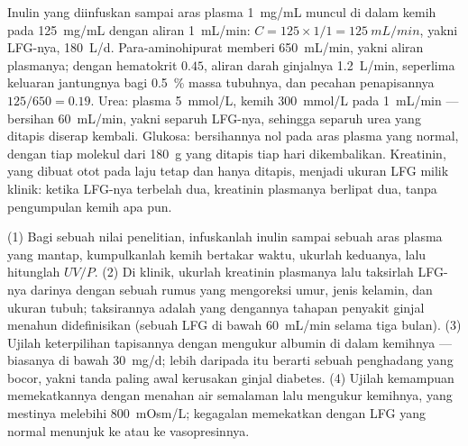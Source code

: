 \begin{example}\label{ex:b3:renal-osmoregulation:numbers}
Inulin yang diinfuskan sampai aras plasma \qty{1}{mg/mL} muncul di dalam kemih pada
\qty{125}{mg/mL} dengan aliran \qty{1}{mL/min}: $C = 125\times 1/1 =
\qty{125}{mL/min}$, yakni LFG-nya, \qty{180}{L/d}. Para-aminohipurat
memberi \qty{650}{mL/min}, yakni aliran plasmanya; dengan hematokrit $0.45$,
aliran darah ginjalnya \qty{1.2}{L/min}, seperlima keluaran
jantungnya bagi \qty{0.5}{\%} massa tubuhnya, dan pecahan penapisannya
$125/650 = 0.19$. Urea: plasma \qty{5}{mmol/L}, kemih \qty{300}{mmol/L}
pada \qty{1}{mL/min} --- bersihan \qty{60}{mL/min}, yakni separuh LFG-nya, sehingga separuh
urea yang ditapis diserap kembali. Glukosa: bersihannya nol pada aras
plasma yang normal, dengan tiap molekul dari \qty{180}{g} yang ditapis tiap hari
dikembalikan. Kreatinin, yang dibuat otot pada laju tetap dan hanya
ditapis, menjadi ukuran LFG milik klinik: ketika LFG-nya terbelah dua,
kreatinin plasmanya berlipat dua, tanpa pengumpulan kemih apa pun.
\end{example}

\begin{method}\label{met:b3:renal-osmoregulation:gfr}
(1) Bagi sebuah nilai penelitian, infuskanlah inulin sampai sebuah aras plasma yang mantap,
kumpulkanlah kemih bertakar waktu, ukurlah keduanya, lalu hitunglah $UV/P$. (2) Di
klinik, ukurlah kreatinin plasmanya lalu taksirlah LFG-nya darinya
dengan sebuah rumus yang mengoreksi umur, jenis kelamin, dan ukuran tubuh; taksirannya
adalah yang dengannya tahapan penyakit ginjal menahun didefinisikan (sebuah LFG
di bawah \qty{60}{mL/min} selama tiga bulan). (3) Ujilah keterpilihan
tapisannya dengan mengukur albumin di dalam kemihnya --- biasanya di bawah
\qty{30}{mg/d}; lebih daripada itu berarti sebuah penghadang yang bocor, yakni tanda paling awal
kerusakan ginjal diabetes. (4) Ujilah kemampuan memekatkannya dengan
menahan air semalaman lalu mengukur  kemihnya, yang
mestinya melebihi \qty{800}{mOsm/L}; kegagalan memekatkan dengan LFG yang
normal menunjuk ke  atau ke vasopresinnya.
\end{method}

